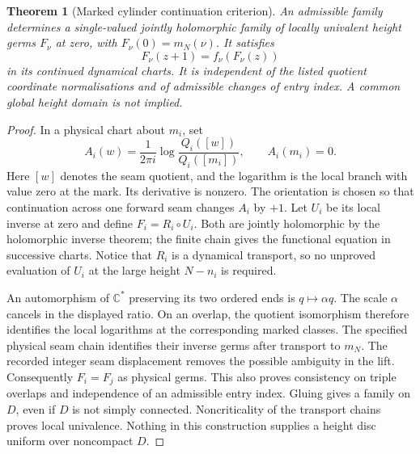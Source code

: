 \documentclass[11pt]{article}
\newtheorem{theorem}{Theorem}
\newcommand{\C}{\mathbb C}
\begin{document}
\begin{theorem}[Marked cylinder continuation criterion]
\label{thm:atlas-criterion}
An admissible family determines a single-valued jointly holomorphic
family of locally univalent height germs $F_\nu$ at zero, with
$F_\nu(0)=m_N(\nu)$. It satisfies
\[
 F_\nu(z+1)=f_\nu(F_\nu(z))
\]
in its continued dynamical charts. It is independent of the listed
quotient coordinate normalisations and of admissible changes of entry
index. A common global height domain is not implied.
\end{theorem}
\begin{proof}
In a physical chart about $m_i$, set
\[
 A_i(w)=\frac{1}{2\pi i}\log\frac{Q_i([w])}{Q_i([m_i])},\qquad A_i(m_i)=0.
\]
Here $[w]$ denotes the seam quotient, and the logarithm is the local
branch with value zero at the mark. Its derivative is nonzero. The
orientation is chosen so that continuation across one forward seam
changes $A_i$ by $+1$. Let $U_i$ be its local inverse at zero and define
$F_i=R_i\circ U_i$. Both are jointly holomorphic by the holomorphic
inverse theorem; the finite chain gives the functional equation in
successive charts. Notice that $R_i$ is a dynamical transport, so no
unproved evaluation of $U_i$ at the large height $N-n_i$ is required.

An automorphism of $\C^*$ preserving its two ordered ends is $q\mapsto
\alpha q$. The scale $\alpha$ cancels in the displayed ratio. On an
overlap, the quotient isomorphism therefore identifies the local
logarithms at the corresponding marked classes. The specified physical
seam chain identifies their inverse germs after transport to $m_N$.
The recorded integer seam displacement removes the possible ambiguity
in the lift. Consequently $F_i=F_j$ as physical germs. This also proves
consistency on triple overlaps and independence of an admissible entry
index. Gluing gives a family on $D$, even if $D$ is not simply connected.
Noncriticality of the transport chains proves local univalence. Nothing
in this construction supplies a height disc uniform over noncompact $D$.
\end{proof}
\end{document}
